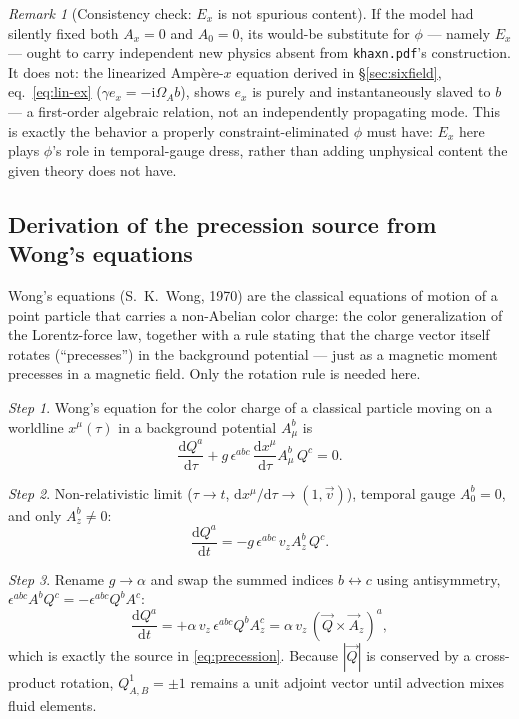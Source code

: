 \documentclass[11pt,a4paper]{article}
\numberwithin{equation}{section}
\theoremstyle{remark}
\newtheorem{remark}[lemma]{Remark}
\newtheorem{step}{Step}[subsection]
\newcommand{\OmA}{\Omega_A}
\newcommand{\dd}{\mathrm{d}}
\newcommand{\ii}{\mathrm{i}}
\begin{document}
\begin{remark}[Consistency check: $E_x$ is not spurious content]
If the model had silently fixed both $A_x=0$ and $A_0=0$, its would-be
substitute for $\phi$ --- namely $E_x$ --- ought to carry independent new
physics absent from \texttt{khaxn.pdf}'s construction. It does not: the
linearized Amp\`ere-$x$ equation derived in \S\ref{sec:sixfield},
eq.~\eqref{eq:lin-ex} ($\gamma e_x=-\ii\OmA b$), shows $e_x$ is purely
and instantaneously slaved to $b$ --- a first-order algebraic relation,
not an independently propagating mode. This is exactly the behavior a
properly constraint-eliminated $\phi$ must have: $E_x$ here plays
$\phi$'s role in temporal-gauge dress, rather than adding unphysical
content the given theory does not have.
\end{remark}

\subsection{Derivation of the precession source from Wong's equations}
\label{ssec:wong}

Wong's equations (S.~K.~Wong, 1970) are the classical equations of
motion of a point particle that carries a non-Abelian color charge:
the color generalization of the Lorentz-force law, together with a rule
stating that the charge vector itself rotates (``precesses'') in the
background potential --- just as a magnetic moment precesses in a
magnetic field. Only the rotation rule is needed here.

\begin{step}
Wong's equation for the color charge of a classical particle moving on a
worldline $x^\mu(\tau)$ in a background potential $A^b_\mu$ is
\begin{equation}
\frac{\dd Q^a}{\dd\tau}
+g\,\epsilon^{abc}\,\frac{\dd x^\mu}{\dd\tau}A^b_\mu\,Q^c=0 .
\end{equation}
\end{step}

\begin{step}
Non-relativistic limit ($\tau\to t$, $\dd x^\mu/\dd\tau\to(1,\vec v)$),
temporal gauge $A^b_0=0$, and only $A^b_z\neq0$:
\begin{equation}
\frac{\dd Q^a}{\dd t}
=-g\,\epsilon^{abc}\,v_zA_z^b\,Q^c .
\end{equation}
\end{step}

\begin{step}
Rename $g\to\alpha$ and swap the summed indices $b\leftrightarrow c$ using
antisymmetry, $\epsilon^{abc}A^bQ^c=-\epsilon^{abc}Q^bA^c$:
\begin{equation}
\frac{\dd Q^a}{\dd t}
=+\alpha\,v_z\,\epsilon^{abc}Q^bA_z^c
=\alpha\,v_z\,(\vec Q\times\vec A_z)^a ,
\end{equation}
which is exactly the source in \eqref{eq:precession}. Because $|\vec Q|$ is
conserved by a cross-product rotation, $Q^1_{A,B}=\pm1$ remains a unit
adjoint vector until advection mixes fluid elements.
\end{step}
\end{document}
